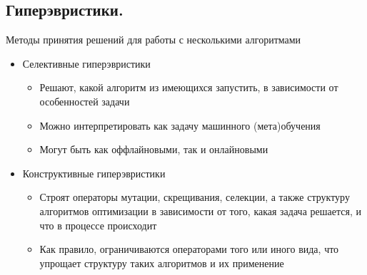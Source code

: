 \subsection{Гиперэвристики.}
Методы принятия решений для работы с несколькими алгоритмами
\begin{itemize}
    \item Селективные гиперэвристики
    \begin{itemize}
        \item Решают, какой алгоритм из имеющихся запустить, в зависимости от особенностей задачи
        \item Можно интерпретировать как задачу машинного (мета)обучения
        \item Могут быть как оффлайновыми, так и онлайновыми
    \end{itemize}
    \item Конструктивные гиперэвристики
    \begin{itemize}
        \item Строят операторы мутации, скрещивания, селекции, а также структуру алгоритмов оптимизации в зависимости от того, какая задача решается, и что в процессе происходит
        \item Как правило, ограничиваются операторами того или иного вида, что упрощает структуру таких алгоритмов и их применение
    \end{itemize}
\end{itemize}      
